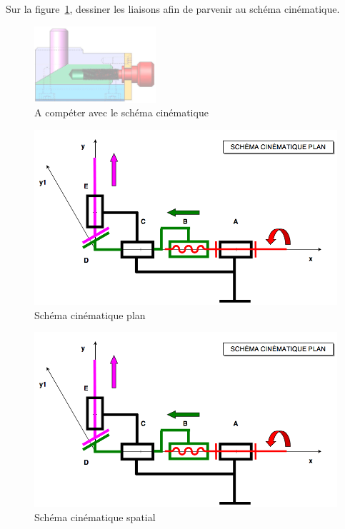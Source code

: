 \documentclass[10pt,fleqn]{article} %
\begin{document}
Sur la figure~\ref{fig:complete}, dessiner les liaisons afin de parvenir au schéma cinématique.
\begin{figure}[h]
  \centering
  \includegraphics[width=0.4\textwidth]{images/equivalence_transparent}
  \caption{A compéter avec le schéma cinématique}
  \label{fig:complete}
\end{figure}

\begin{figure}
  \includegraphics[width=\textwidth]{images/schema_plan}
  \caption{Schéma cinématique plan}
  \label{}
\end{figure}

\begin{figure}
  \includegraphics[width=\textwidth]{images/schema_plan}
  \caption{Schéma cinématique spatial}
  \label{}
\end{figure}
\end{document}
